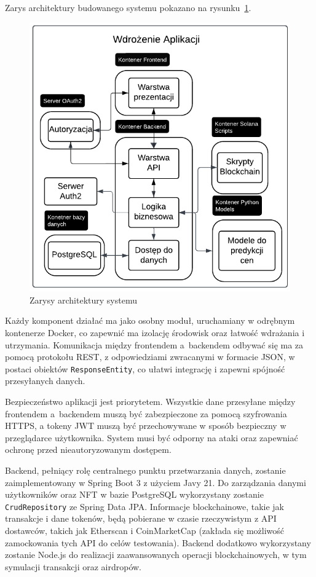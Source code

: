 Zarys architektury budowanego systemu pokazano na rysunku~\ref{fig:ZarysyArchitekturySystemu}.
\begin{figure}[htb] %
    \centering
    \includegraphics[width=0.7\linewidth]{Diagram.pdf}
    \caption{Zarysy architektury systemu}
    \label{fig:ZarysyArchitekturySystemu}
\end{figure}

Każdy komponent działać ma jako osobny moduł, uruchamiany w odrębnym kontenerze Docker, co zapewnić ma izolację środowisk oraz łatwość wdrażania i utrzymania. Komunikacja między frontendem a~backendem odbywać się ma za pomocą protokołu REST, z odpowiedziami zwracanymi w formacie JSON, w postaci obiektów \texttt{ResponseEntity}, co ułatwi integrację i zapewni spójność przesyłanych danych.

Bezpieczeństwo aplikacji jest priorytetem. Wszystkie dane przesyłane między frontendem a~backendem muszą być zabezpieczone za pomocą szyfrowania HTTPS, a tokeny JWT muszą być przechowywane w sposób bezpieczny w przeglądarce użytkownika. System musi być odporny na ataki oraz zapewniać ochronę przed nieautoryzowanym dostępem.

Backend, pełniący rolę centralnego punktu przetwarzania danych, zostanie zaimplementowany w Spring Boot 3 z użyciem Javy 21. Do zarządzania danymi użytkowników oraz NFT w bazie PostgreSQL wykorzystany zostanie \texttt{CrudRepository} ze Spring Data JPA. Informacje blockchainowe, takie jak transakcje i dane tokenów, będą pobierane w czasie rzeczywistym z API dostawców, takich jak Etherscan i CoinMarketCap (zakłada się możliwość zamockowania tych API do celów testowania). Backend dodatkowo wykorzystany zostanie Node.js do realizacji zaawansowanych operacji blockchainowych, w tym symulacji transakcji oraz airdropów.

